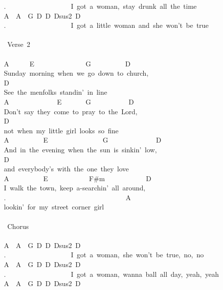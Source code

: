 {.\ \ \ \ \ \ \ \ \ \ \ \ \ \ \ \ \ \ \ I\ got\ a\ woman,\ stay\ drunk\ all\ the\ time\\
A\ \ A\ \ G\ D\ D\ Dsus2\ D\ \ \ \ \ \ \ \ \ \ \ \ \ \ \ \\
.\ \ \ \ \ \ \ \ \ \ \ \ \ \ \ \ \ \ \ I\ got\ a\ little\ woman\ and\ she\ won't\ be\ true\\
\\
\lbrack\ Verse\ 2\rbrack\\
\\
A\ \ \ \ \ \ E\ \ \ \ \ \ \ \ \ \ \ \ \ \ \ G\ \ \ \ \ \ \ \ \ \ D\\
Sunday\ morning\ when\ we\ go\ down\ to\ church,\\
D\\
See\ the\ menfolks\ standin'\ in\ line\\
A\ \ \ \ \ \ \ \ \ \ \ \ \ \ E\ \ \ \ \ \ \ G\ \ \ \ \ \ \ \ \ \ \ D\\
Don't\ say\ they\ come\ to\ pray\ to\ the\ Lord,\\
D\\
not\ when\ my\ little\ girl\ looks\ so\ fine\\
A\ \ \ \ \ \ \ \ \ \ E\ \ \ \ \ \ \ \ \ \ \ \ \ \ \ \ G\ \ \ \ \ \ \ \ \ \ \ \ \ \ D\\
And\ in\ the\ evening\ when\ the\ sun\ is\ sinkin'\ low,\\
D\\
and\ everybody's\ with\ the\ one\ they\ love\\
A\ \ \ \ \ \ \ \ \ \ E\ \ \ \ \ \ \ \ \ \ \ \ F\#m\ \ \ \ \ \ \ \ \ \ \ \ D\\
I\ walk\ the\ town,\ keep\ a-searchin'\ all\ around,\\
.\ \ \ \ \ \ \ \ \ \ \ \ \ \ \ \ \ \ \ \ \ \ \ \ \ \ \ \ \ \ \ \ \ \ \ A\\
lookin'\ for\ my\ street\ corner\ girl\\
\\
\lbrack\ Chorus\rbrack\\
\\
A\ \ A\ \ G\ D\ D\ Dsus2\ D\ \ \ \ \ \ \ \ \ \ \ \ \ \ \ \\
.\ \ \ \ \ \ \ \ \ \ \ \ \ \ \ \ \ \ \ I\ got\ a\ woman,\ she\ won't\ be\ true,\ no,\ no\\
A\ \ A\ \ G\ D\ D\ Dsus2\ D\ \ \ \ \ \ \ \ \ \ \ \ \ \ \ \\
.\ \ \ \ \ \ \ \ \ \ \ \ \ \ \ \ \ \ \ I\ got\ a\ woman,\ wanna\ ball\ all\ day,\ yeah,\ yeah\\
A\ \ A\ \ G\ D\ D\ Dsus2\ D\ \ \ \ \ \ \ \ \ \ \ \ \ \ \ \\
}
